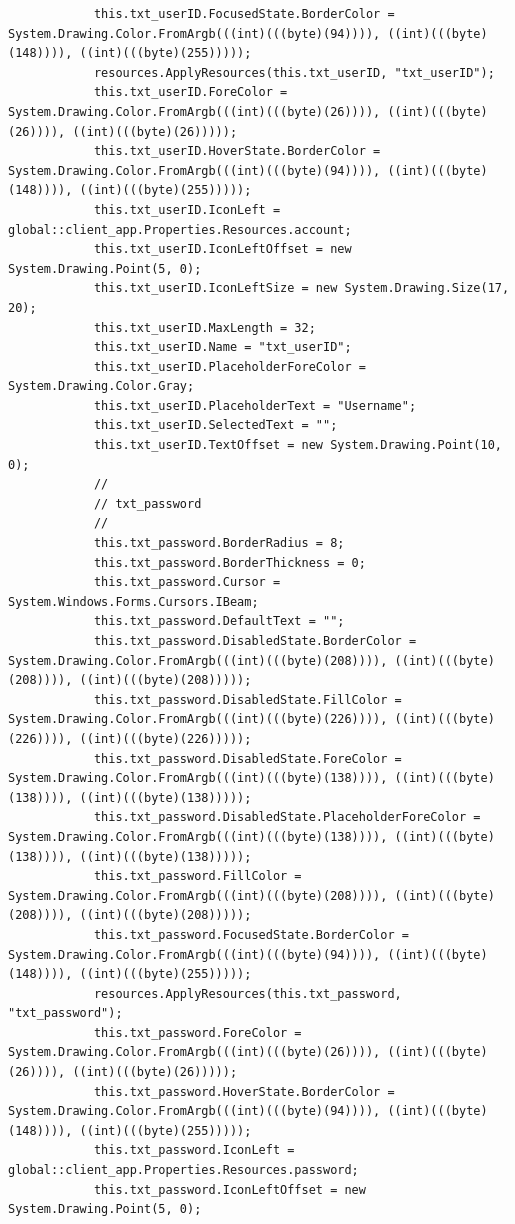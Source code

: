 \documentclass{article}
\begin{document}
\begin{verbatim}
			this.txt_userID.FocusedState.BorderColor = System.Drawing.Color.FromArgb(((int)(((byte)(94)))), ((int)(((byte)(148)))), ((int)(((byte)(255)))));
			resources.ApplyResources(this.txt_userID, "txt_userID");
			this.txt_userID.ForeColor = System.Drawing.Color.FromArgb(((int)(((byte)(26)))), ((int)(((byte)(26)))), ((int)(((byte)(26)))));
			this.txt_userID.HoverState.BorderColor = System.Drawing.Color.FromArgb(((int)(((byte)(94)))), ((int)(((byte)(148)))), ((int)(((byte)(255)))));
			this.txt_userID.IconLeft = global::client_app.Properties.Resources.account;
			this.txt_userID.IconLeftOffset = new System.Drawing.Point(5, 0);
			this.txt_userID.IconLeftSize = new System.Drawing.Size(17, 20);
			this.txt_userID.MaxLength = 32;
			this.txt_userID.Name = "txt_userID";
			this.txt_userID.PlaceholderForeColor = System.Drawing.Color.Gray;
			this.txt_userID.PlaceholderText = "Username";
			this.txt_userID.SelectedText = "";
			this.txt_userID.TextOffset = new System.Drawing.Point(10, 0);
			// 
			// txt_password
			// 
			this.txt_password.BorderRadius = 8;
			this.txt_password.BorderThickness = 0;
			this.txt_password.Cursor = System.Windows.Forms.Cursors.IBeam;
			this.txt_password.DefaultText = "";
			this.txt_password.DisabledState.BorderColor = System.Drawing.Color.FromArgb(((int)(((byte)(208)))), ((int)(((byte)(208)))), ((int)(((byte)(208)))));
			this.txt_password.DisabledState.FillColor = System.Drawing.Color.FromArgb(((int)(((byte)(226)))), ((int)(((byte)(226)))), ((int)(((byte)(226)))));
			this.txt_password.DisabledState.ForeColor = System.Drawing.Color.FromArgb(((int)(((byte)(138)))), ((int)(((byte)(138)))), ((int)(((byte)(138)))));
			this.txt_password.DisabledState.PlaceholderForeColor = System.Drawing.Color.FromArgb(((int)(((byte)(138)))), ((int)(((byte)(138)))), ((int)(((byte)(138)))));
			this.txt_password.FillColor = System.Drawing.Color.FromArgb(((int)(((byte)(208)))), ((int)(((byte)(208)))), ((int)(((byte)(208)))));
			this.txt_password.FocusedState.BorderColor = System.Drawing.Color.FromArgb(((int)(((byte)(94)))), ((int)(((byte)(148)))), ((int)(((byte)(255)))));
			resources.ApplyResources(this.txt_password, "txt_password");
			this.txt_password.ForeColor = System.Drawing.Color.FromArgb(((int)(((byte)(26)))), ((int)(((byte)(26)))), ((int)(((byte)(26)))));
			this.txt_password.HoverState.BorderColor = System.Drawing.Color.FromArgb(((int)(((byte)(94)))), ((int)(((byte)(148)))), ((int)(((byte)(255)))));
			this.txt_password.IconLeft = global::client_app.Properties.Resources.password;
			this.txt_password.IconLeftOffset = new System.Drawing.Point(5, 0);

\end{verbatim}
\end{document}
